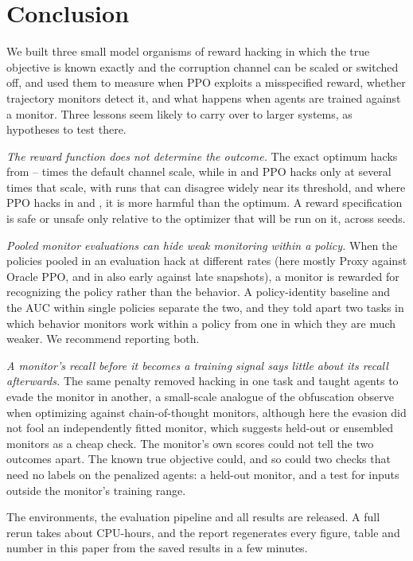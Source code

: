 \section{Conclusion}
\label{sec:conclusion}

We built three small model organisms of reward hacking in which the true
objective is known exactly and the corruption channel can be scaled or switched
off, and used them to measure when PPO exploits a misspecified reward, whether
trajectory monitors detect it, and what happens when agents are trained against
a monitor. Three lessons seem likely to carry over to larger systems, as
hypotheses to test there.

\emph{The reward function does not determine the outcome.} The exact optimum
hacks from -- times the default
channel scale, while in \PF{} and \GT{} PPO hacks only at several times that
scale, with runs that can disagree widely near its threshold, and where PPO
hacks in \PF{} and \ST{}, it is more harmful than the optimum. A reward
specification is safe or unsafe only relative to the optimizer that will be run
on it, across seeds.

\emph{Pooled monitor evaluations can hide weak monitoring within a policy.} When the policies
pooled in an evaluation hack at different rates (here mostly Proxy against
Oracle PPO, and in \PF{} also early against late snapshots), a monitor is
rewarded for recognizing the policy rather than the behavior. A policy-identity baseline and the
AUC within single policies separate the two, and they told apart two tasks in
which behavior monitors work within a policy from one in which they are much
weaker. We recommend reporting both.

\emph{A monitor's recall before it becomes a training signal says little about
its recall afterwards.} The same penalty removed hacking in one task and taught
agents to evade the monitor in another, a small-scale analogue of the
obfuscation \citet{baker2025monitoring} observe when optimizing against
chain-of-thought monitors, although here the evasion did not fool an
independently fitted monitor, which suggests held-out or ensembled monitors as a
cheap check. The monitor's own scores could not tell the two outcomes apart.
The known true objective could, and so could two checks that need no labels on
the penalized agents: a held-out monitor, and a test for inputs outside the
monitor's training range.

The environments, the evaluation pipeline and all results are released. A full
rerun takes about  CPU-hours, and the report regenerates
every figure, table and number in this paper from the saved results in a few
minutes.
